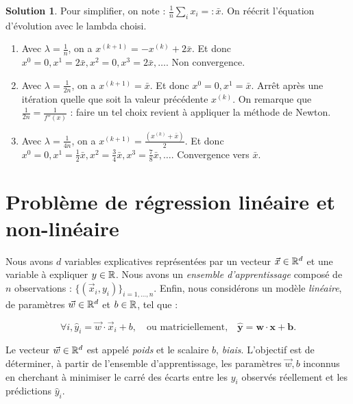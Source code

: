 \documentclass[a4paper,francais]{article}
\newcommand{\R}{{\ensuremath\mathbb{R}}}
\theoremstyle{definition}
\newtheorem*{solution}{Solution}
\begin{document}
\begin{solution}
  Pour simplifier, on note : $\frac{1}{n}\sum_ix_i =: \bar{x}$.
  On réécrit l'équation d'évolution avec le lambda choisi. 
  \begin{enumerate}
  \item Avec $\lambda = \frac{1}{n}$,
    on a $x^{(k+1)} = - x^{(k)} + 2\bar{x}$. Et donc
    $x^0 = 0, x^1 = 2\bar{x}, x^2 = 0, x^3 = 2\bar{x}, \dots$.
    Non convergence. 
  \item Avec $\lambda = \frac{1}{2n}$,
    on a $x^{(k+1)} = \bar{x}$. Et donc
    $x^0 = 0, x^1 = \bar{x}$. Arrêt après une itération
    quelle que soit la valeur précédente $x^{(k)}$.
    On remarque que $\frac{1}{2n} = \frac{1}{f''(x)}$ :
    faire un tel choix revient à appliquer la méthode de Newton. 
  \item Avec $\lambda = \frac{1}{4n}$,
    on a $x^{(k+1)} = \frac{(x^{(k)} + \bar{x})}{2}$. Et donc
    $x^0 = 0, x^1 = \frac{1}{2}\bar{x}, x^2 = \frac{3}{4}\bar{x},
    x^3 = \frac{7}{8}\bar{x}, \dots$.
    Convergence vers $\bar{x}$. 
  \end{enumerate}
\end{solution}

\section{Problème de régression linéaire et non-linéaire}
\label{sec:regression}

\newcommand\mat[1]{\mathbf{#1}}


Nous avons $d$ variables explicatives représentées par un vecteur $\vec{x} \in \R^d$
et une variable à expliquer $y \in \R$.
Nous avons un \emph{ensemble d'apprentissage} composé de $n$ observations :
$\{(\vec{x}_i,y_i)\}_{i = 1,\dots, n}$.
Enfin, nous considérons un modèle \emph{linéaire}, de paramètres $\vec{w} \in \R^d$
et $b \in \R$, tel que :

\[ \forall i, \hat{y}_i = \vec{w} \cdot \vec{x}_i + b, 
\quad \text{ou matriciellement,} \quad
\mat{\hat{y}} = \mat{w} \cdot \mat{x} + \mat{b}. \]

Le vecteur $\vec{w} \in \R^d$ est appelé \emph{poids}
et le scalaire $b$, \emph{biais}. 
L'objectif est de déterminer, à partir de l'ensemble d'apprentissage,
les paramètres $\vec{w},b$ inconnus en cherchant à minimiser le carré des
écarts entre les $y_i$ observés réellement et les prédictions $\hat{y}_i$.
\end{document}
